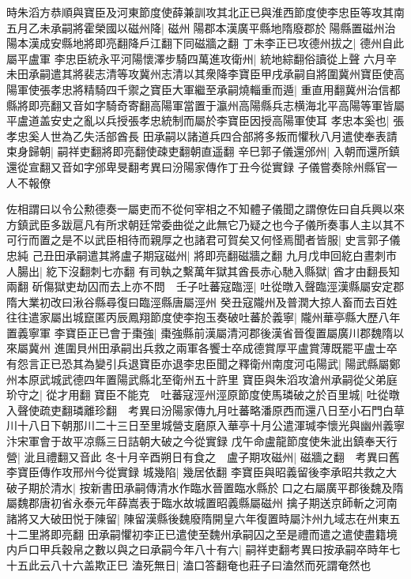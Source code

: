 時朱滔方恭順與寶臣及河東節度使薛兼訓攻其北正已與淮西節度使李忠臣等攻其南五月乙未承嗣將霍榮國以磁州降|{
	磁州陽郡本漢廣平縣地隋廢郡於陽縣置磁州治陽本漢成安縣地將即亮翻降戶江翻下同磁牆之翻}
丁未李正已攻德州拔之|{
	德州自此屬平盧軍}
李忠臣統永平河陽懷澤步騎四萬進攻衛州|{
	統地綜翻俗讀從上聲}
六月辛未田承嗣遣其將裴志清等攻冀州志清以其衆降李寶臣甲戌承嗣自將圍冀州寶臣使高陽軍使張孝忠將精騎四千禦之寶臣大軍繼至承嗣燒輜重而遁|{
	重直用翻冀州治信都縣將即亮翻又音如字騎奇寄翻高陽軍當置于瀛州高陽縣兵志横海北平高陽等軍皆屬平盧道盖安史之亂以兵授張孝忠統制而屬於李寶臣因授高陽軍使耳}
孝忠本奚也|{
	張孝忠奚人世為乙失活部酋長}
田承嗣以諸道兵四合部將多叛而懼秋八月遣使奉表請束身歸朝|{
	嗣祥吏翻將即亮翻使疎吏翻朝直遥翻}
辛巳郭子儀還邠州|{
	入朝而還所鎮還從宣翻又音如字邠卑旻翻考異曰汾陽家傳作丁丑今從實録}
子儀嘗奏除州縣官一人不報僚

佐相謂曰以令公勲德奏一屬吏而不從何宰相之不知體子儀聞之謂僚佐曰自兵興以來方鎮武臣多跋扈凡有所求朝廷常委曲從之此無它乃疑之也今子儀所奏事人主以其不可行而置之是不以武臣相待而親厚之也諸君可賀矣又何怪焉聞者皆服|{
	史言郭子儀忠純}
己丑田承嗣遣其將盧子期寇磁州|{
	將即亮翻磁牆之翻}
九月戊申回紇白晝刺市人腸出|{
	紇下沒翻刺七亦翻}
有司執之繫萬年獄其酋長赤心馳入縣獄|{
	酋才由翻長知兩翻}
斫傷獄吏劫囚而去上亦不問　壬子吐蕃寇臨涇|{
	吐從暾入聲臨涇漢縣屬安定郡隋大業初改曰湫谷縣尋復曰臨涇縣唐屬涇州}
癸丑寇隴州及普潤大掠人畜而去百姓往往遣家屬出城竄匿丙辰鳳翔節度使李抱玉奏破吐蕃於義寧|{
	隴州華亭縣大歷八年置義寧軍}
李寶臣正已會于棗強|{
	棗強縣前漢屬清河郡後漢省晉復置屬廣川郡魏隋以來屬冀州}
進圍貝州田承嗣出兵救之兩軍各饗士卒成德賞厚平盧賞薄既罷平盧士卒有怨言正已恐其為變引兵退寶臣亦退李忠臣聞之釋衛州南度河屯陽武|{
	陽武縣屬鄭州本原武城武德四年置陽武縣北至衛州五十許里}
寶臣與朱滔攻滄州承嗣從父弟庭玠守之|{
	從才用翻}
寶臣不能克　吐蕃寇涇州涇原節度使馬璘破之於百里城|{
	吐從暾入聲使疏吏翻璘離珍翻　考異曰汾陽家傳九月吐蕃略潘原西而還八日至小石門白草川十八日下朝那川二十三日至里城營支磨原入華亭十月公遣渾瑊李懷光與幽州義寧汴宋軍會于故平凉縣三日詰朝大破之今從實録}
戊午命盧龍節度使朱泚出鎮奉天行營|{
	泚且禮翻又音此}
冬十月辛酉朔日有食之　盧子期攻磁州|{
	磁牆之翻　考異曰舊李寶臣傳作攻邢州今從實録}
城幾陷|{
	幾居依翻}
李寶臣與昭義留後李承昭共救之大破子期於清水|{
	按新書田承嗣傳清水作臨水晉置臨水縣於口之右屬廣平郡後魏及隋屬魏郡唐初省永泰元年薛嵩表于臨水故城置昭義縣屬磁州}
擒子期送京師斬之河南諸將又大破田悦于陳留|{
	陳留漢縣後魏廢隋開皇六年復置時屬汴州九域志在州東五十二里將即亮翻}
田承嗣懼初李正已遣使至魏州承嗣囚之至是禮而遣之遣使盡籍境内戶口甲兵穀帛之數以與之曰承嗣今年八十有六|{
	嗣祥吏翻考異曰按承嗣卒時年七十五此云八十六盖欺正巳}
溘死無日|{
	溘口答翻奄也莊子曰溘然而死謂奄然也}
